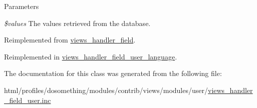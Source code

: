 \begin{DoxyParams}{Parameters}
\item[{\em \$values}]The values retrieved from the database. \end{DoxyParams}


Reimplemented from \hyperlink{classviews__handler__field_a82ff951c5e9ceb97b2eab86f880cbc1e}{views\_\-handler\_\-field}.

Reimplemented in \hyperlink{classviews__handler__field__user__language_aaa89fbb3f01a1dd279f3195eaa837693}{views\_\-handler\_\-field\_\-user\_\-language}.

The documentation for this class was generated from the following file:\begin{DoxyCompactItemize}
\item 
html/profiles/dosomething/modules/contrib/views/modules/user/\hyperlink{views__handler__field__user_8inc}{views\_\-handler\_\-field\_\-user.inc}\end{DoxyCompactItemize}
